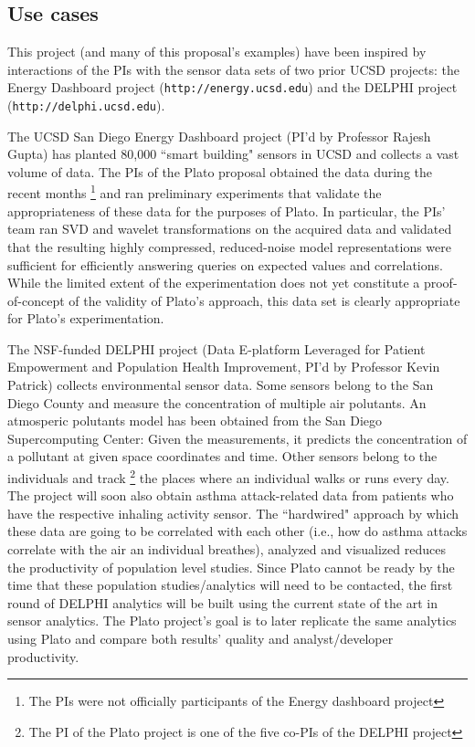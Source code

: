 \subsection{Use cases}
\label{sec:use-cases}
This project (and many of this proposal's examples) have been inspired by interactions of the PIs with the sensor data sets of two prior UCSD projects: the Energy Dashboard project ({\tt http://energy.ucsd.edu}) and the DELPHI project ({\tt http://delphi.ucsd.edu}). 

The UCSD San Diego Energy Dashboard project (PI'd by Professor Rajesh Gupta) has planted 80,000 ``smart building" sensors in UCSD and collects a vast volume of data. The PIs of the Plato proposal obtained the data during the recent months%
\footnote{The PIs were not officially participants of the Energy dashboard project} 
and ran preliminary experiments that validate the appropriateness of these data for the purposes of Plato. In particular, the PIs' team ran SVD and wavelet transformations on the acquired data and validated that the resulting highly compressed, reduced-noise model representations were sufficient for efficiently answering queries on expected values and correlations. While the limited extent of the experimentation does not yet constitute a proof-of-concept of the validity of Plato's approach, this data set is clearly appropriate for Plato's experimentation.

The NSF-funded DELPHI project (Data E-platform Leveraged for Patient Empowerment and Population Health Improvement, PI'd by Professor Kevin Patrick) collects environmental sensor data. Some sensors belong to the San Diego County and measure the concentration of multiple air polutants. An atmosperic polutants model has been obtained from the San Diego Supercomputing Center: Given the measurements, it predicts the concentration of a pollutant at given space coordinates and time. Other sensors belong to the individuals and track %
\footnote{The PI of the Plato project is one of the five co-PIs of the DELPHI project} 
the places where an individual walks or runs every day. The project will soon also obtain asthma attack-related data from patients who have the respective inhaling activity sensor. The ``hardwired" approach by which these data are going to be correlated with each other (i.e., how do asthma attacks correlate with the air an individual breathes), analyzed and visualized reduces the productivity of population level studies. Since Plato cannot be ready by the time that these population studies/analytics will need to be contacted, the first round of DELPHI analytics will be built using the current state of the art in sensor analytics. The Plato project's goal is to later replicate the same analytics using Plato and compare both results' quality and analyst/developer productivity.